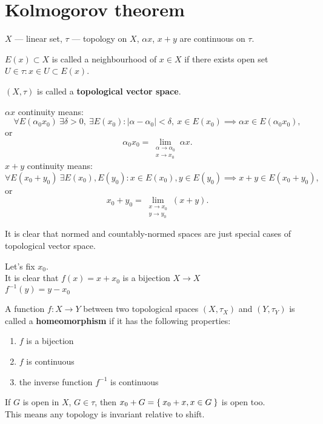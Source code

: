 \section{Kolmogorov theorem}
\begin{defn}
  $X$ --- linear set, $\tau$ --- topology on $X$, $\alpha x$, $x + y$ are
  continuous on $\tau$.

  \noindent $E(x) \subset X$ is called a neighbourhood of $x \in X$ if there
  exists open set $U \in \tau: x \in U \subset E(x)$.
  
  \noindent $(X, \tau)$ is called a \textbf{topological vector space}.
  
  \noindent $\alpha x$ continuity means:
  \[
    \forall E(\alpha_0 x_0)\ \exists \delta > 0,\ \exists E(x_0) \colon
    |\alpha - \alpha_0| < \delta,\ x \in E(x_0) \implies
    \alpha x \in E(\alpha_0 x_0),
  \]
  or
  \[
    \alpha_0 x_0 = \lim_{\substack{\alpha \to \alpha _0\\ x \to x_0}} \alpha x.
  \]
  \noindent $x + y$ continuity means:
  \[
    \forall E(x_0 + y_0)\ \exists E(x_0), E(y_0) \colon
    x \in E(x_0), y \in E(y_0) \implies x + y \in E(x_0 + y_0),
  \]
  or 
  \[
    x_0 + y_0 = \lim_{\substack{x \to x_0\\ y \to y_0}}(x + y).
  \]
\end{defn}

\noindent
It is clear that normed and countably-normed spaces are just special cases of
topological vector space.

\noindent
Let's fix $x_0$.\\
It is clear that $f(x) = x + x_0$ is a bijection $X \to X$ \\
$f^{-1}(y) = y - x_0$ \\

\begin{defn}
  A function $f \colon X \to Y$ between two topological spaces $(X, \tau_X)$ and
  $(Y, \tau_Y)$ is called a \textbf{homeomorphism} if it has the following properties:
  \begin{enumerate}
  \item $f$ is a bijection
  \item $f$ is continuous 
  \item the inverse function $f^{-1}$ is continuous
  \end{enumerate}
\end{defn}

\noindent
If $G$ is open in $X$, $G \in \tau$, then $x_0 + G = \Set{x_0 + x, x \in G}$ is
open too. \\
This means any topology is invariant relative to shift. \\

